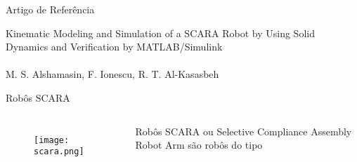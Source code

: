 \begin{frame}[t]{Artigo de Referência} 
    \begin{center}
        \huge 
        Kinematic Modeling and Simulation of a SCARA Robot by Using Solid Dynamics and Verification by
        MATLAB/Simulink\\
        \!
        \\
        \normalsize
        M. S. Alshamasin, F. Ionescu, R. T. Al-Kasasbeh
        
    \end{center}
\end{frame}

\begin{frame}[c]{Robôs SCARA} 

    \begin{columns}

        \begin{figure}
            \texttt{[image: scara.png]}
        \end{figure}


        Robôs SCARA ou Selective Compliance Assembly Robot Arm são robôs do tipo
    \end{columns}

    


\end{frame}
